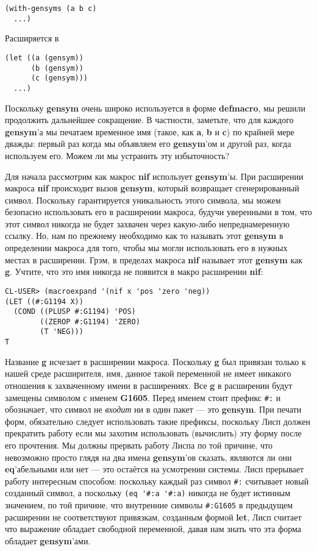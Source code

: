 \begin{verbatim}
(with-gensyms (a b c)
  ...)
\end{verbatim}

Расширяется в

\begin{verbatim}
(let ((a (gensym))
      (b (gensym))
      (c (gensym)))
  ...)
\end{verbatim}

Поскольку \textbf{gensym} очень широко используется в форме \textbf{defmacro}, мы решили продолжить дальнейшее сокращение. В частности, заметьте, что для каждого \textbf{gensym}'а мы печатаем временное имя (такое, как \textbf{a}, \textbf{b} и \textbf{c}) по крайней мере дважды: первый раз когда мы объявляем его \textbf{gensym}'ом и другой раз, когда используем его. Можем ли мы устранить эту избыточность?

Для начала рассмотрим как макрос \textbf{nif} использует \textbf{gensym}'ы. При расширении макроса \textbf{nif} происходит вызов \textbf{gensym}, который возвращает сгенерированный символ. Поскольку гарантируется уникальность этого символа, мы можем безопасно использовать его в расширении макроса, будучи уверенными в том, что этот символ никогда не будет захвачен через какую-либо непреднамеренную ссылку. Но, нам по прежнему необходимо как то называть этот \textbf{gensym} в определении макроса для того, чтобы мы могли использовать его в нужных местах в расширении. Грэм, в пределах макроса \textbf{nif} называет этот \textbf{gensym} как \textbf{g}. Учтите, что это имя никогда не появится в макро расширении \textbf{nif}:

\begin{verbatim}
CL-USER> (macroexpand '(nif x 'pos 'zero 'neg))
(LET ((#:G1194 X))
  (COND ((PLUSP #:G1194) 'POS) 
        ((ZEROP #:G1194) 'ZERO) 
        (T 'NEG)))
T
\end{verbatim}

Название \textbf{g} исчезает в расширении макроса. Поскольку \textbf{g} был привязан только к нашей среде расширителя, имя, данное такой переменной не имеет никакого отношения к захваченному имени в расширениях. Все \textbf{g} в расширении будут замещены символом с именем \textbf{G1605}. Перед именем стоит префикс \verb"#:" и обозначает, что символ не \emph{входит} ни в один пакет --- это \textbf{gensym}. При печати форм, обязательно следует использовать такие префиксы, поскольку Лисп должен прекратить работу если мы захотим использовать (вычислить) эту форму после его прочтения. Мы должны прервать работу Лиспа по той причине, что невозможно просто глядя на два имена \textbf{gensym}'ов сказать, являются ли они \textbf{eq}'абельными или нет --- это остаётся на усмотрении системы. Лисп прерывает работу интересным способом: поскольку каждый раз символ \verb"#:" считывает новый созданный символ, а поскольку \verb"(eq '#:a '#:a)" никогда не будет истинным значением, по той причине, что внутренние символы \verb"#:G1605" в предыдущем расширении не соответствуют привязкам, созданным формой \textbf{let}, Лисп считает что выражение обладает свободной переменной, давая нам знать что эта форма обладает \textbf{gensym}'ами.

